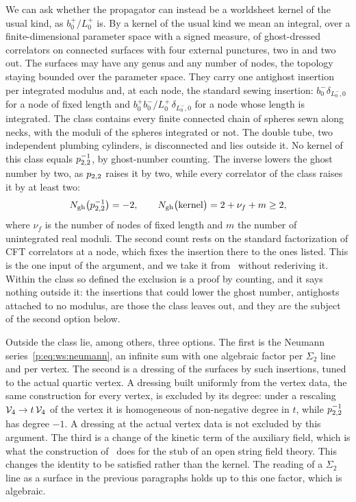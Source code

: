 We can ask whether the propagator can instead be a worldsheet kernel of the usual kind, as $b_0^+ / L_0^+$ is.
By a kernel of the usual kind we mean an integral, over a finite-dimensional parameter space with a signed measure, of ghost-dressed correlators on connected surfaces with four external punctures, two in and two out.
The surfaces may have any genus and any number of nodes, the topology staying bounded over the parameter space.
They carry one antighost insertion per integrated modulus and, at each node, the standard sewing insertion: $b_0^- \delta_{L_0^-, 0}$ for a node of fixed length and $b_0^+ b_0^- / L_0^+ \, \delta_{L_0^-, 0}$ for a node whose length is integrated.
The class contains every finite connected chain of spheres sewn along necks, with the moduli of the spheres integrated or not.
The double tube, two independent plumbing cylinders, is disconnected and lies outside it.
No kernel of this class equals $p_{2,2}^{-1}$, by ghost-number counting.
The inverse lowers the ghost number by two, as $p_{2,2}$ raises it by two, while every correlator of the class raises it by at least two:
\begin{equation}
  \label{p:eq:ws:ghost-obstruction}
  N_{\text{gh}}\big( p_{2,2}^{-1} \big)
    = - 2,
  \qquad
  N_{\text{gh}}\big( \text{kernel} \big)
    = 2 + \nu_f + m
    \ge 2,
\end{equation}
where $\nu_f$ is the number of nodes of fixed length and $m$ the number of unintegrated real moduli.
The second count rests on the standard factorization of CFT correlators at a node, which fixes the insertion there to the ones listed.
This is the one input of the argument, and we take it from~\cite[ch.~9]{Polchinski:2005:StringTheoryVolume} without rederiving it.
Within the class so defined the exclusion is a proof by counting, and it says nothing outside it: the insertions that could lower the ghost number, antighosts attached to no modulus, are those the class leaves out, and they are the subject of the second option below.

Outside the class lie, among others, three options.
The first is the Neumann series~\eqref{p:eq:ws:neumann}, an infinite sum with one algebraic factor per $\Sigma_2$ line and per vertex.
The second is a dressing of the surfaces by such insertions, tuned to the actual quartic vertex.
  A dressing built uniformly from the vertex data, the same construction for every vertex, is excluded by its degree: under a rescaling $\mathcal{V}_{4} \to t \, \mathcal{V}_{4}$ of the vertex it is homogeneous of non-negative degree in $t$, while $p_{2,2}^{-1}$ has degree $- 1$.
  A dressing at the actual vertex data is not excluded by this argument.
The third is a change of the kinetic term of the auxiliary field, which is what the construction of~\cite{Erbin:2024:OpenStringStub} does for the stub of an open string field theory.
This changes the identity to be satisfied rather than the kernel.
The reading of a $\Sigma_2$ line as a surface in the previous paragraphs holds up to this one factor, which is algebraic.


